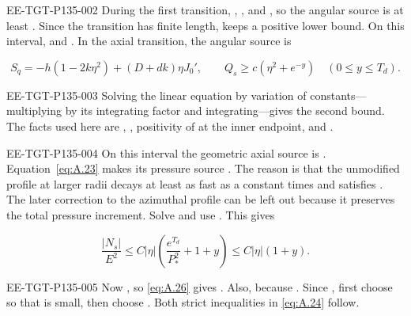 \begin{EESegment}{EE-TGT-P135-002}
During the first transition, ,
, and , so the angular source is at least
. Since the transition has finite length,  keeps a positive lower
bound. On this interval,  and . In the axial transition, the
angular source  is
\end{EESegment}
\begin{equation}
 S_q=-h(1-2k\eta^2)+(D+dk)\eta J_0',\qquad
 Q_s\geq c(\eta^2+e^{-y})\quad(0\leq y\leq T_d).
 \tag{A.26}\label{eq:A.26}
\end{equation}
\begin{EESegment}{EE-TGT-P135-003}
Solving the linear equation by variation of constants---multiplying by its integrating factor and integrating---gives
the second bound. The facts used here are
, , positivity of
 at the inner endpoint, and .
\end{EESegment}

\begin{EESegment}{EE-TGT-P135-004}
On this interval the geometric axial source is . Equation~\eqref{eq:A.23} makes its
pressure source . The reason is that the unmodified profile at larger radii decays at
least as fast as a constant times  and satisfies
. The later correction to the azimuthal profile can be left out
because it preserves the total pressure increment. Solve  and use
. This gives
\end{EESegment}
\[
 \frac{|N_s|}{E^2}\leq C|\eta|
 \left(\frac{e^{T_d}}{P_*^2}+1+y\right)\leq C|\eta|(1+y).
\]
\begin{EESegment}{EE-TGT-P135-005}
Now , so \eqref{eq:A.26} gives
. Also,  because
. Since , first choose
 so that  is small, then choose
. Both strict inequalities in \eqref{eq:A.24} follow.
\end{EESegment}

